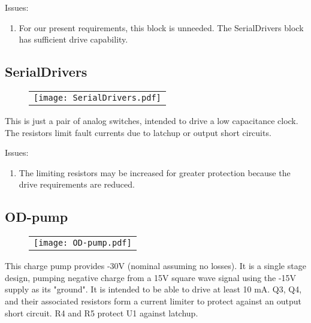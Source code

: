 \documentclass[a4paper,12pt]{article}
\begin{document}
Issues:
\begin{enumerate}
\item
For our present requirements, this block is unneeded. The SerialDrivers block has sufficient drive capability.
\end{enumerate}


\subsection{SerialDrivers}
   \begin{figure}
   \begin{center}
   \begin{tabular}{c}
   \texttt{[image: SerialDrivers.pdf]}
   \end{tabular}
   \end{center}
   \end{figure}
   
This is just a pair of analog switches, intended to drive a low capacitance clock. The resistors limit fault currents due to latchup or output short circuits.

Issues:
\begin{enumerate}
\item
The limiting resistors may be increased for greater protection because the drive requirements are reduced.
\end{enumerate}


\subsection{OD-pump}

   \begin{figure}
   \begin{center}
   \begin{tabular}{c}
   \texttt{[image: OD-pump.pdf]}
   \end{tabular}
   \end{center}
   \end{figure}
   
This charge pump provides -30V (nominal assuming no losses). It is a single stage design, pumping negative charge from a 15V square wave signal using the -15V supply as its "ground". It is intended to be able to drive at least 10 mA. Q3, Q4, and their associated resistors form a current limiter to protect against an output short circuit. R4 and R5 protect U1 against latchup.
\end{document}

